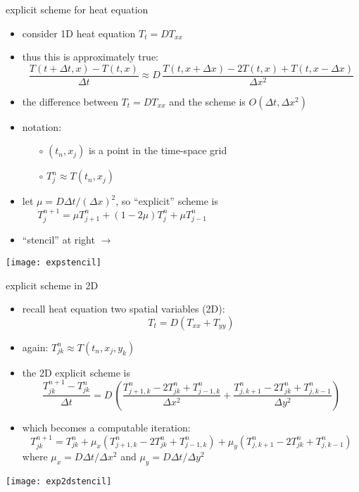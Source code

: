 \begin{frame}{explicit scheme for heat equation}
\label{slide:explicit}

\begin{itemize}
\item consider 1D heat equation $T_t = D T_{xx}$
\item thus this is approximately true:
\small
	$$\frac{T(t+\Delta t,x) - T(t,x)}{\Delta t} \approx D\,\frac{T(t,x+\Delta x) - 2 T(t,x) + T(t,x-\Delta x)}{\Delta x^2}$$
\normalsize
\item the difference between $T_t = D T_{xx}$ and the scheme is $O(\Delta t,\Delta x^2)$
\item notation:
    \begin{itemize}
    \item[$\circ$] $(t_n,x_j)$ is a point in the time-space grid
    \item[$\circ$] $T_j^n \approx T(t_n,x_j)$  
    \end{itemize} 
\item let $\mu = D \Delta t / (\Delta x)^2$, so ``explicit'' scheme is
\small
	$$T_j^{n+1} = \mu T_{j+1}^n + (1 - 2 \mu) T_j^n + \mu T_{j-1}^n \phantom{sdfkj sdkfj asdlfj asldkfj asdflkj}$$
\normalsize
\item ``stencil'' at right \large $\to$ \normalsize
\end{itemize}

\vspace{-12mm}
\hfill \texttt{[image: expstencil]}
\end{frame}


\begin{frame}{explicit scheme in 2D}

\begin{itemize}
\item recall heat equation two spatial variables (2D):
    $$T_t = D(T_{xx} + T_{yy})$$
\item again: $T_{jk}^n \approx T(t_n,x_j,y_k)$
\item the 2D explicit scheme is
\small
	$$\frac{T_{jk}^{n+1} - T_{jk}^n}{\Delta t} = D\,\left(\frac{T_{j+1,k}^n - 2 T_{jk}^n + T_{j-1,k}^n}{\Delta x^2} + \frac{T_{j,k+1}^n - 2 T_{jk}^n + T_{j,k-1}^n}{\Delta y^2}\right)$$
\normalsize
\item which becomes a computable iteration:
\small
	$$T_{jk}^{n+1} = T_{jk}^n + \mu_x (T_{j+1,k}^n - 2 T_{jk}^n + T_{j-1,k}^n) + \mu_y (T_{j,k+1}^n - 2 T_{jk}^n + T_{j,k-1}^n)$$
\normalsize
where $\mu_x=D\Delta t/\Delta x^2$ and $\mu_y = D\Delta t/\Delta y^2$
\end{itemize}

\begin{center}
\texttt{[image: exp2dstencil]}
\end{center}
\end{frame}


